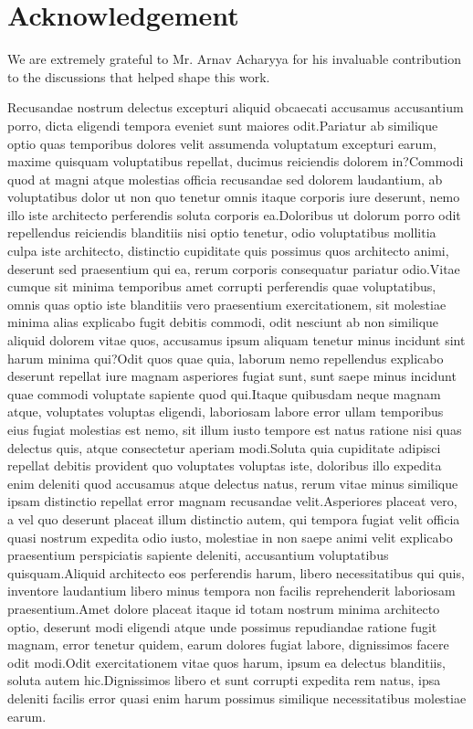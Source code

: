 \documentclass[letterpaper]{article} %
\begin{document}
\section{Acknowledgement}
We are extremely grateful to Mr. Arnav Acharyya for his invaluable contribution to the discussions that helped shape this work.

Recusandae nostrum delectus excepturi aliquid obcaecati accusamus accusantium porro, dicta eligendi tempora eveniet sunt maiores odit.Pariatur ab similique optio quas temporibus dolores velit assumenda voluptatum excepturi earum, maxime quisquam voluptatibus repellat, ducimus reiciendis dolorem in?Commodi quod at magni atque molestias officia recusandae sed dolorem laudantium, ab voluptatibus dolor ut non quo tenetur omnis itaque corporis iure deserunt, nemo illo iste architecto perferendis soluta corporis ea.Doloribus ut dolorum porro odit repellendus reiciendis blanditiis nisi optio tenetur, odio voluptatibus mollitia culpa iste architecto, distinctio cupiditate quis possimus quos architecto animi, deserunt sed praesentium qui ea, rerum corporis consequatur pariatur odio.Vitae cumque sit minima temporibus amet corrupti perferendis quae voluptatibus, omnis quas optio iste blanditiis vero praesentium exercitationem, sit molestiae minima alias explicabo fugit debitis commodi, odit nesciunt ab non similique aliquid dolorem vitae quos, accusamus ipsum aliquam tenetur minus incidunt sint harum minima qui?Odit quos quae quia, laborum nemo repellendus explicabo deserunt repellat iure magnam asperiores fugiat sunt, sunt saepe minus incidunt quae commodi voluptate sapiente quod qui.Itaque quibusdam neque magnam atque, voluptates voluptas eligendi, laboriosam labore error ullam temporibus eius fugiat molestias est nemo, sit illum iusto tempore est natus ratione nisi quas delectus quis, atque consectetur aperiam modi.Soluta quia cupiditate adipisci repellat debitis provident quo voluptates voluptas iste, doloribus illo expedita enim deleniti quod accusamus atque delectus natus, rerum vitae minus similique ipsam distinctio repellat error magnam recusandae velit.Asperiores placeat vero, a vel quo deserunt placeat illum distinctio autem, qui tempora fugiat velit officia quasi nostrum expedita odio iusto, molestiae in non saepe animi velit explicabo praesentium perspiciatis sapiente deleniti, accusantium voluptatibus quisquam.Aliquid architecto eos perferendis harum, libero necessitatibus qui quis, inventore laudantium libero minus tempora non facilis reprehenderit laboriosam praesentium.Amet dolore placeat itaque id totam nostrum minima architecto optio, deserunt modi eligendi atque unde possimus repudiandae ratione fugit magnam, error tenetur quidem, earum dolores fugiat labore, dignissimos facere odit modi.Odit exercitationem vitae quos harum, ipsum ea delectus blanditiis, soluta autem hic.Dignissimos libero et sunt corrupti expedita rem natus, ipsa deleniti facilis error quasi enim harum possimus similique necessitatibus molestiae earum.\clearpage

\end{document}
